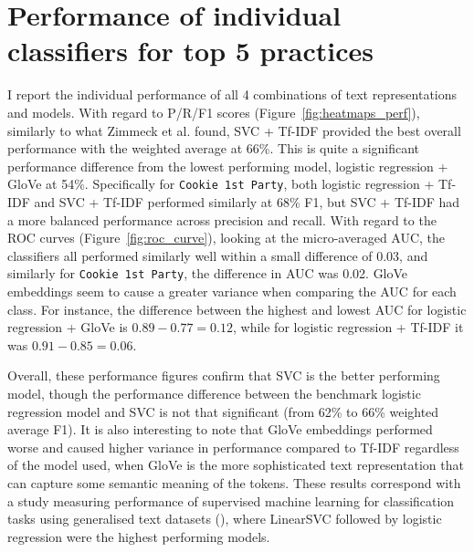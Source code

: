 \section{Performance of individual classifiers for top 5 practices}
I report the individual performance of all 4 combinations of text representations and models. With regard to P/R/F1 scores (Figure~\ref{fig:heatmaps_perf}), similarly to what Zimmeck et al. found, SVC + Tf-IDF provided the best overall performance with the weighted average at 66\%. This is quite a significant performance difference from the lowest performing model, logistic regression + GloVe at 54\%. Specifically for \texttt{Cookie 1st Party}, both logistic regression + Tf-IDF and SVC + Tf-IDF performed similarly at 68\% F1, but SVC + Tf-IDF had a more balanced performance across precision and recall. With regard to the ROC curves (Figure~\ref{fig:roc_curve}), looking at the micro-averaged AUC, the classifiers all performed similarly well within a small difference of 0.03, and similarly for \texttt{Cookie 1st Party}, the difference in AUC was 0.02. GloVe embeddings seem to cause a greater variance when comparing the AUC for each class. For instance, the difference between the highest and lowest AUC for logistic regression + GloVe is $0.89 - 0.77 = 0.12$, while for logistic regression + Tf-IDF it was $0.91 - 0.85 = 0.06$.

Overall, these performance figures confirm that SVC is the better performing model, though the performance difference between the benchmark logistic regression model and SVC is not that significant (from 62\% to 66\% weighted average F1). It is also interesting to note that GloVe embeddings performed worse and caused higher variance in performance compared to Tf-IDF regardless of the model used, when GloVe is the more sophisticated text representation that can capture some semantic meaning of the tokens. These results correspond with a study measuring performance of supervised machine learning for classification tasks using generalised text datasets (\cite{hsu2020}), where LinearSVC followed by logistic regression were the highest performing models.

